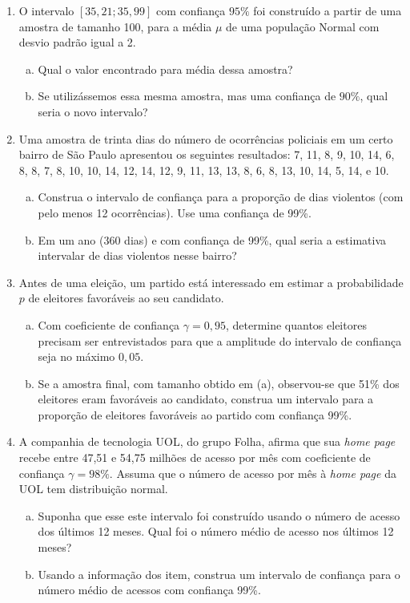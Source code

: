 \documentclass[12pt, a4paper]{article}
\begin{document}
\begin{enumerate}
  
  \item O intervalo $[35,21; 35,99]$ com confiança $95\%$ foi construído a partir de uma amostra de tamanho 100, para a média $\mu$ de uma população Normal com desvio padrão igual a 2.
	\begin{enumerate}[(a)]
		\item  Qual o valor encontrado para média dessa amostra?
		\item Se utilizássemos essa mesma amostra, mas uma confiança de $90\%$, qual seria o novo intervalo?
	\end{enumerate}
	
  \item Uma amostra de trinta dias do número de ocorrências policiais em um certo bairro de São Paulo apresentou os seguintes resultados: 7, 11, 8, 9, 10, 14, 6, 8, 8, 7, 8, 10, 10, 14, 12, 14, 12, 9, 11, 13, 13, 8, 6, 8, 13, 10,  14, 5, 14, e 10. 
	\begin{enumerate}[(a)]
		\item Construa o intervalo de confiança para a proporção de dias violentos (com pelo menos 12 ocorrências). Use uma confiança de 99\%.
		\item Em um ano (360 dias) e com confiança de 99\%, qual seria a estimativa intervalar de dias violentos nesse bairro?
	\end{enumerate}
	
  \item Antes de uma eleição, um partido está interessado em estimar a probabilidade $p$ de eleitores favoráveis ao seu candidato. 
	\begin{enumerate}[(a)]
		\item Com coeficiente de confiança $\gamma = 0,95$, determine quantos eleitores precisam ser entrevistados para que a amplitude do intervalo de confiança seja no máximo $0,05$.
		\item Se a amostra final, com tamanho obtido em (a), observou-se que 51\% dos eleitores eram favoráveis ao candidato, construa um intervalo para a proporção de eleitores favoráveis ao partido  com confiança 99\%.
	\end{enumerate}
	
  \item A companhia de tecnologia UOL, do grupo Folha, afirma que sua \textit{home page} recebe entre 47,51 e 54,75 milhões de acesso por mês com coeficiente de confiança $\gamma=98\%$. Assuma que o número de acesso  por mês à \textit{home page} da UOL tem distribuição normal.
	\begin{enumerate}[(a)]
		\item Suponha que esse este intervalo foi construído usando o número de acesso dos últimos 12 meses. Qual foi o número médio de acesso nos últimos 12 meses?
		\item Usando a informação dos item, construa um intervalo de confiança para o número médio de acessos com confiança 99\%.
	\end{enumerate}
	

\end{enumerate}
\end{document}
